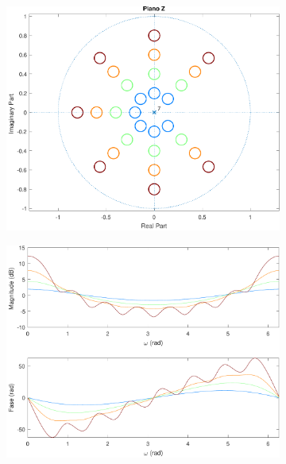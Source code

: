 \documentclass[a4paper,11pt]{article}
\numberwithin{figure}{section}
\numberwithin{equation}{section}
\numberwithin{table}{section}
\theoremstyle{definition}
\begin{document}
\begin{figure}[ht]
\begin{subfigure}{0.44\textwidth}
		\includegraphics[width=\textwidth]{ex_2_pz_8}
	\end{subfigure}
	\begin{subfigure}{0.44\textwidth}
		\includegraphics[width=\textwidth]{ex_2_bode_8}
	\end{subfigure}\\
	\begin{subfigure}{0.44\textwidth}

\end{subfigure}
\end{figure}
\end{document}
